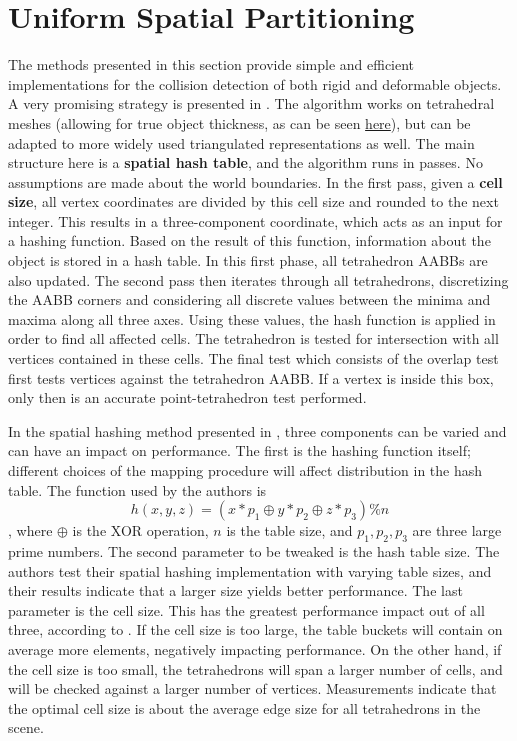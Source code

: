 \FloatBarrier
\section{Uniform Spatial Partitioning}
\label{sec:usp}



The methods presented in this section provide simple and efficient implementations for the collision detection of both rigid and deformable objects. A very promising strategy is presented in \citep{thm03}. The algorithm works on tetrahedral meshes (allowing for true object thickness, as can be seen \hyperref[img:tetra-hash]{here}), but can be adapted to more widely used triangulated representations as well. The main structure here is a \textbf{spatial hash table}, and the algorithm runs in passes. No assumptions are made about the world boundaries. In the first pass, given a \textbf{cell size}, all vertex coordinates are divided by this cell size and rounded to the next integer. This results in a three-component coordinate, which acts as an input for a hashing function. Based on the result of this function, information about the object is stored in a hash table. In this first phase, all tetrahedron AABBs are also updated. The second pass then iterates through all tetrahedrons, discretizing the AABB corners and considering all discrete values between the minima and maxima along all three axes. Using these values, the hash function is applied in order to find all affected cells. The tetrahedron is tested for intersection with all vertices contained in these cells. The final test which consists of the overlap test first tests vertices against the tetrahedron AABB. If a vertex is inside this box, only then is an accurate point-tetrahedron test performed.


In the spatial hashing method presented in \citep{thm03}, three components can be varied and can have an impact on performance. The first is the hashing function itself; different choices of the mapping procedure will affect distribution in the hash table. The function used by the authors is \[h(x, y, z) = (x * p_{1} \oplus y * p_{2} \oplus  z * p_{3}) \% n \], where $\oplus$ is the XOR operation, $n$ is the table size, and $p_{1}, p_{2}, p_{3}$ are three large prime numbers. The second parameter to be tweaked is the hash table size. The authors test their spatial hashing implementation with varying table sizes, and their results indicate that a larger size yields better performance. The last parameter is the cell size. This has the greatest performance impact out of all three, according to \citep{thm03}. If the cell size is too large, the table buckets will contain on average more elements, negatively impacting performance. On the other hand, if the cell size is too small, the tetrahedrons will span a larger number of cells, and will be checked against a larger number of vertices. Measurements indicate that the optimal cell size is about the average edge size for all tetrahedrons in the scene.


